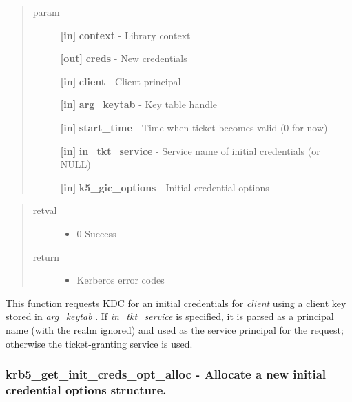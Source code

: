 \documentclass[letterpaper,10pt,english]{sphinxmanual}
\begin{document}
\begin{quote}\begin{description}
\item[{param}] \leavevmode
\textbf{{[}in{]}} \textbf{context} - Library context

\textbf{{[}out{]}} \textbf{creds} - New credentials

\textbf{{[}in{]}} \textbf{client} - Client principal

\textbf{{[}in{]}} \textbf{arg\_keytab} - Key table handle

\textbf{{[}in{]}} \textbf{start\_time} - Time when ticket becomes valid (0 for now)

\textbf{{[}in{]}} \textbf{in\_tkt\_service} - Service name of initial credentials (or NULL)

\textbf{{[}in{]}} \textbf{k5\_gic\_options} - Initial credential options

\end{description}\end{quote}
\begin{quote}\begin{description}
\item[{retval}] \leavevmode\begin{itemize}
\item {} 
0   Success

\end{itemize}

\item[{return}] \leavevmode\begin{itemize}
\item {} 
Kerberos error codes

\end{itemize}

\end{description}\end{quote}

This function requests KDC for an initial credentials for \emph{client} using a client key stored in \emph{arg\_keytab} . If \emph{in\_tkt\_service} is specified, it is parsed as a principal name (with the realm ignored) and used as the service principal for the request; otherwise the ticket-granting service is used.


\subsubsection{krb5\_get\_init\_creds\_opt\_alloc -  Allocate a new initial credential options structure.}
\label{appdev/refs/api/krb5_get_init_creds_opt_alloc:krb5-get-init-creds-opt-alloc-allocate-a-new-initial-credential-options-structure}\label{appdev/refs/api/krb5_get_init_creds_opt_alloc::doc}
\end{document}
